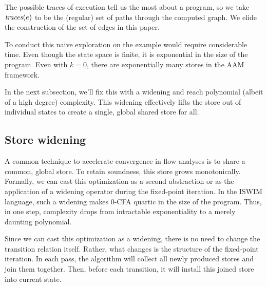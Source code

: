 \documentclass[preprint,onecolumn,9pt]{sigplanconf} %
\newcommand{\naive}{naive}
\begin{document}
The possible traces of execution tell us the most about a program, so
we take $\mathit{traces}(e)$ to be the (regular) set of paths through the
computed graph. We elide the construction of the set of edges in this paper.

To conduct this \naive{} exploration on the \Church{} example would require
considerable time.  Even though the state space is finite, it is exponential in
the size of the program.  Even with $k = 0$, there are exponentially many
stores in the AAM framework.

In the next subsection, we'll fix this with a widening and reach polynomial
(albeit of a high degree) complexity.
%
This widening effectively lifts the store out of individual states to create
a single, global shared store for all.


\subsection{Store widening}
\label{sec:storewiden}

A common technique to accelerate convergence in flow analyses is to share a
common, global store.
%
To retain soundness, this store grows monotonically.
%
Formally, we can cast this optimization as a second abstraction or as the
application of a widening operator during the fixed-point iteration.
%
In the ISWIM language, such a widening makes 0-CFA quartic in the size of the
program.
%
Thus, in one step, complexity drops from intractable exponentiality to a merely
daunting polynomial.

Since we can cast this optimization as a widening, there is no need to change
the transition relation itself.
%
Rather, what changes is the structure of the fixed-point iteration.
%
In each pass, the algorithm will collect all newly produced stores and join
them together.
%
Then, before each transition, it will install this joined store into current
state.
\end{document}
